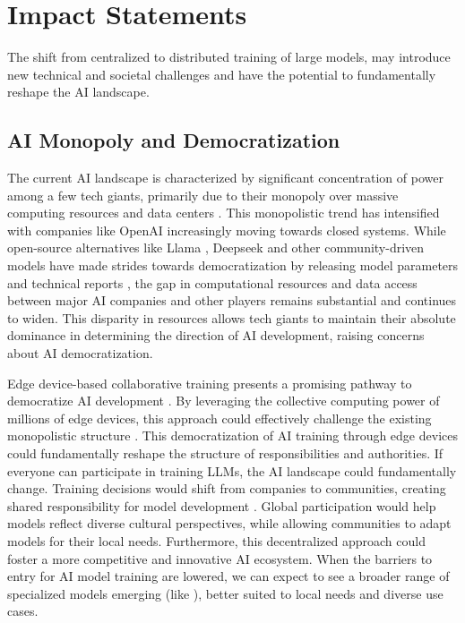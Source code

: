 \section{Impact Statements}\label{sec:impacts}

The shift from centralized to distributed training of large models, may introduce new technical and societal challenges and have the potential to fundamentally reshape the AI landscape. 


\subsection{AI Monopoly and Democratization}\label{subsec:ai_monopoly_and_democratization}


The current AI landscape is characterized by significant concentration of power among a few tech giants, primarily due to their monopoly over massive computing resources and data centers \cite{bommasani2021opportunities}. This monopolistic trend has intensified with companies like OpenAI increasingly moving towards closed systems. 
While open-source alternatives like Llama \cite{touvron2023llama3}, Deepseek \cite{liu2024deepseek} and other community-driven models have made strides towards democratization by releasing model parameters and technical reports \cite{welsh2024democratising}, the gap in computational resources and data access between major AI companies and other players remains substantial and continues to widen. 
This disparity in resources allows tech giants to maintain their absolute dominance in determining the direction of AI development, raising concerns about AI democratization. 


Edge device-based collaborative training presents a promising pathway to democratize AI development \cite{yao2022edge}.
By leveraging the collective computing power of millions of edge devices, this approach could effectively challenge the existing monopolistic structure \cite{dong2025beyond}. 
This democratization of AI training through edge devices could fundamentally reshape the structure of responsibilities and authorities.
If everyone can participate in training LLMs, the AI landscape could fundamentally change. Training decisions would shift from companies to communities, creating shared responsibility for model development \cite{zeng2023distributed}. Global participation would help models reflect diverse cultural perspectives, while allowing communities to adapt models for their local needs.
Furthermore, this decentralized approach could foster a more competitive and innovative AI ecosystem. When the barriers to entry for AI model training are lowered, we can expect to see a broader range of specialized models emerging (like \cite{song2025injecting,MedicalGPT,li2023large,yao2024lawyer,AlphaEvolve}), better suited to local needs and diverse use cases.


